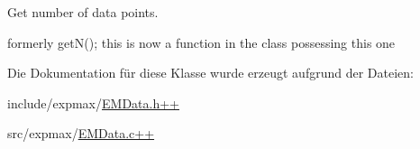 Get number of data points. 

formerly getN(); this is now a function in the class possessing this one 

Die Dokumentation für diese Klasse wurde erzeugt aufgrund der Dateien:\begin{DoxyCompactItemize}
\item 
include/expmax/\hyperlink{EMData_8h_09_09}{EMData.h++}\item 
src/expmax/\hyperlink{EMData_8c_09_09}{EMData.c++}\end{DoxyCompactItemize}

